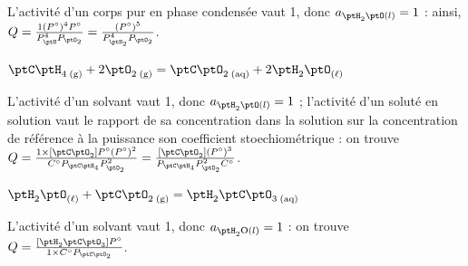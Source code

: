 \begin{corrige}
L'activité d'un corps pur en phase condensée vaut 1, donc $a_{\ptH_2\ptO(l)}=1$ : ainsi, $Q=\frac{1 (P^{\circ})^4 P^{\circ}}{P_{\ptH}^4 P_{\ptO_2}}=\frac{(P^{\circ})^5}{P_{{\ptH_2}}^4 P_{\ptO_2}}$.
\end{corrige}



\begin{enonce}
$\ptC\ptH_{4 \; \mathrm{(g)}} + 2 \ptO_{2 \; \mathrm{(g)}} = \ptC\ptO_{2 \; \mathrm{(aq)}} + 2 \ptH_2\ptO_{\mathrm{(\ell)}}$
\end{enonce}


\begin{corrige}
L'activité d'un solvant vaut 1, donc $a_{{\ptH_2}\ptO(l)}=1$ ; l'activité d'un soluté en solution vaut le rapport de sa concentration dans la solution sur la concentration de référence à la puissance son coefficient stoechiométrique : on trouve $Q=\frac{1 \times [\ptC\ptO_2] P^{\circ} (P^{\circ})^2}{C^\circ P_{{\ptC\ptH}_4} P_{{\ptO_2}}^2}=\frac{[\ptC\ptO_2] (P^{\circ})^3}{P_{\ptC\ptH_4} P_{{\ptO_2}}^2 C^\circ}$.
\end{corrige}



\begin{enonce}
$\ptH_2\ptO_{\mathrm{(\ell)}} + \ptC\ptO_{2 \; \mathrm{(g)}} = \ptH_2\ptC\ptO_{3 \; \mathrm{(aq)}}$
\end{enonce}


\begin{corrige}
L'activité d'un solvant vaut 1, donc $a_{{\ptH_2}\mathrm{O}(l)}=1$ : on trouve $Q=\frac{[{\ptH_2}\ptC\ptO_3] P^{\circ}}{1 \times C^\circ P_{\ptC\ptO_2}}$.
\end{corrige}


\finEntrainement




